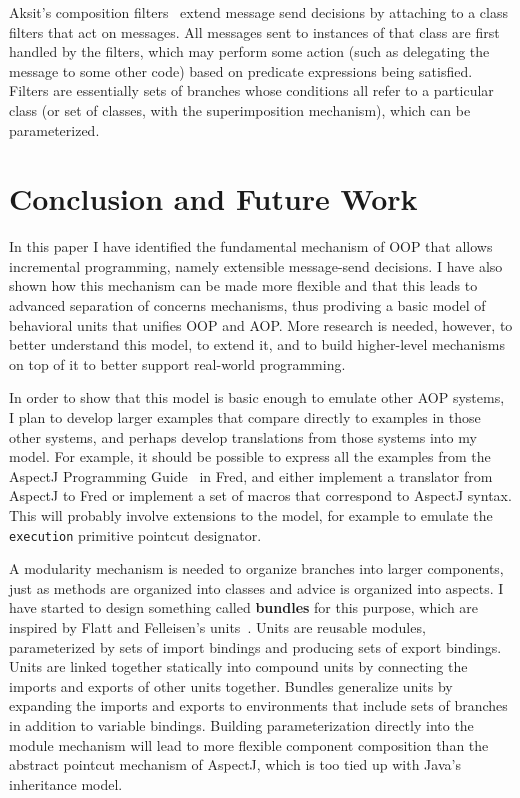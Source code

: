 \documentclass{article}
\newcommand{\defn}[1]{\textbf{#1}}
\newcommand{\code}[1]{\texttt{#1}}
\begin{document}
Aksit's composition filters~\cite{comp-filt} extend message
send decisions by attaching to a class filters that act on messages.
All messages sent to instances of that class are first handled by the
filters, which may perform some action (such as delegating the message
to some other code) based on predicate expressions being satisfied.
Filters are essentially sets of branches whose conditions all refer to
a particular class (or set of classes, with the superimposition
mechanism), which can be parameterized.

\section{Conclusion and Future Work}
\label{section:conclusion}

In this paper I have identified the fundamental mechanism of OOP that
allows incremental programming, namely extensible message-send
decisions.  I have also shown how this mechanism can be made more
flexible and that this leads to advanced separation of concerns
mechanisms, thus prodiving a basic model of behavioral units that
unifies OOP and AOP.  More research is needed, however, to better
understand this model, to extend it, and to build higher-level
mechanisms on top of it to better support real-world programming.

In order to show that this model is basic enough to emulate other AOP
systems, I plan to develop larger examples that compare directly to
examples in those other systems, and perhaps develop translations from
those systems into my model.  For example, it should be possible to
express all the examples from the AspectJ Programming
Guide~\cite{AspectJ-prog-guide} in Fred, and either implement a
translator from AspectJ to Fred or implement a set of macros that
correspond to AspectJ syntax.  This will probably involve extensions
to the model, for example to emulate the \code{execution} primitive
pointcut designator.

A modularity mechanism is needed to organize branches into larger
components, just as methods are organized into classes and advice is
organized into aspects.  I have started to design something called
\defn{bundles} for this purpose, which are inspired by Flatt and
Felleisen's units~\cite{flatt98units}.  Units are reusable modules,
parameterized by sets of import bindings and producing sets of export
bindings.  Units are linked together statically into compound units by
connecting the imports and exports of other units together.  Bundles
generalize units by expanding the imports and exports to environments
that include sets of branches in addition to variable bindings.
Building parameterization directly into the module mechanism will lead
to more flexible component composition than the abstract pointcut
mechanism of AspectJ, which is too tied up with Java's inheritance
model.
\end{document}
